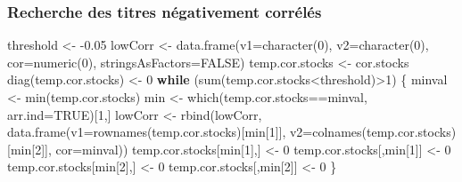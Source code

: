 \documentclass[
]{article}
\newenvironment{Shaded}{\begin{snugshade}}{\end{snugshade}}
\newcommand{\AttributeTok}[1]{\textcolor[rgb]{0.77,0.63,0.00}{#1}}
\newcommand{\ConstantTok}[1]{\textcolor[rgb]{0.00,0.00,0.00}{#1}}
\newcommand{\ControlFlowTok}[1]{\textcolor[rgb]{0.13,0.29,0.53}{\textbf{#1}}}
\newcommand{\DecValTok}[1]{\textcolor[rgb]{0.00,0.00,0.81}{#1}}
\newcommand{\FloatTok}[1]{\textcolor[rgb]{0.00,0.00,0.81}{#1}}
\newcommand{\FunctionTok}[1]{\textcolor[rgb]{0.00,0.00,0.00}{#1}}
\newcommand{\NormalTok}[1]{#1}
\newcommand{\OtherTok}[1]{\textcolor[rgb]{0.56,0.35,0.01}{#1}}
\newcommand{\SpecialCharTok}[1]{\textcolor[rgb]{0.00,0.00,0.00}{#1}}
\begin{document}
\hypertarget{recherche-des-titres-nuxe9gativement-corruxe9luxe9s}{%
\subsubsection{Recherche des titres négativement
corrélés}\label{recherche-des-titres-nuxe9gativement-corruxe9luxe9s}}

\begin{Shaded}
\begin{Highlighting}[]
\NormalTok{threshold }\OtherTok{\textless{}{-}} \SpecialCharTok{{-}}\FloatTok{0.05}
\NormalTok{lowCorr }\OtherTok{\textless{}{-}} \FunctionTok{data.frame}\NormalTok{(}\AttributeTok{v1=}\FunctionTok{character}\NormalTok{(}\DecValTok{0}\NormalTok{), }\AttributeTok{v2=}\FunctionTok{character}\NormalTok{(}\DecValTok{0}\NormalTok{), }\AttributeTok{cor=}\FunctionTok{numeric}\NormalTok{(}\DecValTok{0}\NormalTok{), }
                      \AttributeTok{stringsAsFactors=}\ConstantTok{FALSE}\NormalTok{)}
\NormalTok{temp.cor.stocks }\OtherTok{\textless{}{-}}\NormalTok{ cor.stocks}
\FunctionTok{diag}\NormalTok{(temp.cor.stocks) }\OtherTok{\textless{}{-}} \DecValTok{0}
\ControlFlowTok{while}\NormalTok{ (}\FunctionTok{sum}\NormalTok{(temp.cor.stocks}\SpecialCharTok{\textless{}}\NormalTok{threshold)}\SpecialCharTok{\textgreater{}}\DecValTok{1}\NormalTok{) \{}
\NormalTok{  minval }\OtherTok{\textless{}{-}} \FunctionTok{min}\NormalTok{(temp.cor.stocks)}
\NormalTok{  min }\OtherTok{\textless{}{-}} \FunctionTok{which}\NormalTok{(temp.cor.stocks}\SpecialCharTok{==}\NormalTok{minval, }\AttributeTok{arr.ind=}\ConstantTok{TRUE}\NormalTok{)[}\DecValTok{1}\NormalTok{,]}
\NormalTok{  lowCorr }\OtherTok{\textless{}{-}} \FunctionTok{rbind}\NormalTok{(lowCorr, }\FunctionTok{data.frame}\NormalTok{(}\AttributeTok{v1=}\FunctionTok{rownames}\NormalTok{(temp.cor.stocks)[min[}\DecValTok{1}\NormalTok{]], }
                                       \AttributeTok{v2=}\FunctionTok{colnames}\NormalTok{(temp.cor.stocks)[min[}\DecValTok{2}\NormalTok{]], }
                                       \AttributeTok{cor=}\NormalTok{minval))}
\NormalTok{  temp.cor.stocks[min[}\DecValTok{1}\NormalTok{],] }\OtherTok{\textless{}{-}} \DecValTok{0}
\NormalTok{  temp.cor.stocks[,min[}\DecValTok{1}\NormalTok{]] }\OtherTok{\textless{}{-}} \DecValTok{0}
\NormalTok{  temp.cor.stocks[min[}\DecValTok{2}\NormalTok{],] }\OtherTok{\textless{}{-}} \DecValTok{0}
\NormalTok{  temp.cor.stocks[,min[}\DecValTok{2}\NormalTok{]] }\OtherTok{\textless{}{-}} \DecValTok{0}
\NormalTok{\}}


\end{Highlighting}
\end{Shaded}
\end{document}

